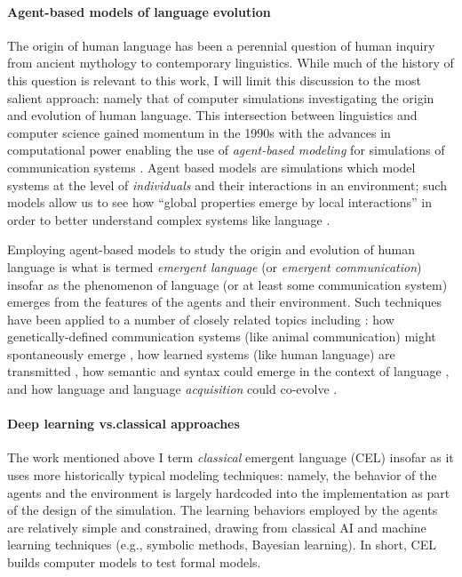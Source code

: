 \paragraph{Agent-based models of language evolution}
The origin of human language has been a perennial question of human inquiry from ancient mythology to contemporary linguistics.
While much of the history of this question is relevant to this work, I will limit this discussion to the most salient approach: namely that of computer simulations investigating the origin and evolution of human language.
This intersection between linguistics and computer science gained momentum in the 1990s with the advances in computational power enabling the use of \emph{agent-based modeling} for simulations of communication systems \citep{steels1997synthetic}.
Agent based models are simulations which model systems at the level of \emph{individuals} and their interactions in an environment;
  such models allow us to see how ``global properties emerge by local interactions'' in order to better understand complex systems like language \citep{steels1997synthetic}.

Employing agent-based models to study the origin and evolution of human language is what is termed \emph{emergent language} (or \emph{emergent communication}) insofar as the phenomenon of language (or at least some communication system) emerges from the features of the agents and their environment.
Such techniques have been applied to a number of closely related topics including \citep{kirby2002alife}:
  how genetically-defined communication systems (like animal communication) might spontaneously emerge \citep{maclennan},
  how learned systems (like human language) are transmitted \citep{smith2002cultural},
  how semantic and syntax could emerge in the context of language \citep{steels1999heads,batali1998grammar},
  and how language and language \emph{acquisition} could co-evolve \citep{kirby1997learning}.



\paragraph{Deep learning vs.\@ classical approaches}
The work mentioned above I term \emph{classical} emergent language (CEL) insofar as it uses more historically typical modeling techniques: namely, the behavior of the agents and the environment is largely hardcoded into the implementation as part of the design of the simulation.
The learning behaviors employed by the agents are relatively simple and constrained, drawing from classical AI and machine learning techniques (e.g., symbolic methods, Bayesian learning).
In short, CEL builds computer models to test formal models.


